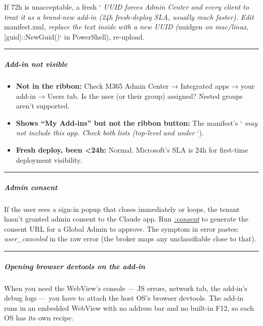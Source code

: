 \documentclass[11pt]{article}
\begin{document}
If 72h is unacceptable, a fresh `\emph{ UUID forces Admin Center and every client to treat it as a brand-new add-in (24h fresh-deploy SLA, usually much faster). Edit }manifest.xml\emph{, replace the text inside }\emph{ with a new UUID (}uuidgen\emph{ on mac/linux, }[guid]::NewGuid()` in PowerShell), re-upload.


\vspace{0.5em}\hrule\vspace{0.5em}

\subparagraph{Add-in not visible}\mbox{}\par

\begin{itemize}[leftmargin=*,itemsep=2pt,topsep=2pt]
\item {} \textbf{Not in the ribbon:} Check M365 Admin Center → Integrated apps → your add-in → Users tab. Is the user (or their group) assigned? Nested groups aren't supported.
\item {} \textbf{Shows ``My Add-ins'' but not the ribbon button:} The manifest's `\emph{ may not include this app. Check both }\emph{ lists (top-level and under }`).
\item {} \textbf{Fresh deploy, been <24h:} Normal. Microsoft's SLA is 24h for first-time deployment visibility.
\end{itemize}

\vspace{0.5em}\hrule\vspace{0.5em}

\subparagraph{Admin consent}\mbox{}\par

If the user sees a sign-in popup that closes immediately or loops, the tenant hasn't granted admin consent to the Claude app. Run \href{consent.md}{\emph{:consent}} to generate the consent URL for a Global Admin to approve. The symptom in error pastes: \emph{user\_\allowbreak{}canceled} in the raw error (the broker maps any unclassifiable close to that).


\vspace{0.5em}\hrule\vspace{0.5em}

\subparagraph{Opening browser devtools on the add-in}\mbox{}\par

When you need the WebView's console — JS errors, network tab, the add-in's debug logs — you have to attach the host OS's browser devtools. The add-in runs in an embedded WebView with no address bar and no built-in F12, so each OS has its own recipe.
\end{document}
